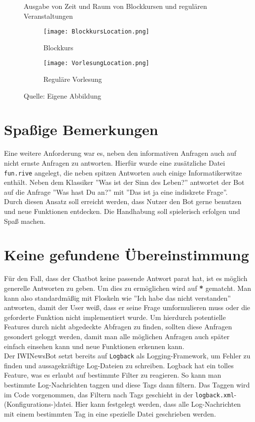 \begin{figure}[!htb]
    \centering
    \caption{Ausgabe von Zeit und Raum von Blockkursen und regulären Veranstaltungen}
    \begin{subfigure}{.5\textwidth}
        \centering
        \caption{Blockkurs}
          \texttt{[image: BlockkursLocation.png]}
          \label{img:blockkurs}
    \end{subfigure}%
    \begin{subfigure}{.5\textwidth}
        \centering
        \caption{Reguläre Vorlesung}
          \texttt{[image: VorlesungLocation.png]}
          \label{img:vorlesung}
    \end{subfigure}
    \caption*{Quelle: Eigene Abbildung}
    \label{fig:blockkursUndVorlesung}
\end{figure}

\section{Spaßige Bemerkungen}
Eine weitere Anforderung war es, neben den informativen Anfragen auch auf nicht ernste Anfragen zu antworten. Hierfür wurde eine zusätzliche Datei \texttt{fun.rive} angelegt, die neben spitzen Antworten auch einige Informatikerwitze enthält. Neben dem Klassiker ''Was ist der Sinn des Leben?'' antwortet der Bot auf die Anfrage ''Was hast Du an?'' mit ''Das ist ja eine indiskrete Frage''. \\
Durch diesen Ansatz soll erreicht werden, dass Nutzer den Bot gerne benutzen und neue Funktionen entdecken. Die Handhabung soll spielerisch erfolgen und Spaß machen.

\section{Keine gefundene Übereinstimmung}
Für den Fall, dass der Chatbot keine passende Antwort parat hat, ist es möglich generelle Antworten zu geben. Um dies zu ermöglichen wird auf \textbf{*} gematcht. Man kann also standardmäßig mit Floskeln wie ''Ich habe das nicht verstanden'' antworten, damit der User weiß, dass er seine Frage umformulieren muss oder die geforderte Funktion nicht implementiert wurde. Um hierdurch potentielle Features durch nicht abgedeckte Abfragen zu finden, sollten diese Anfragen gesondert geloggt werden, damit man alle möglichen Anfragen auch später einfach einsehen kann und neue Funktionen erkennen kann. \\
Der IWINewsBot setzt bereits auf \texttt{Logback} als Logging-Framework, um Fehler zu finden und aussagekräftige Log-Dateien zu schreiben. Logback hat ein tolles Feature, was es erlaubt auf bestimmte Filter zu reagieren. So kann man bestimmte Log-Nachrichten taggen und diese Tags dann filtern. Das Taggen wird im Code vorgenommen, das Filtern nach Tags geschieht in der \texttt{logback.xml}-(Konfigurations-)datei. Hier kann festgelegt werden, dass alle Log-Nachrichten mit einem bestimmten Tag in eine spezielle Datei geschrieben werden.



